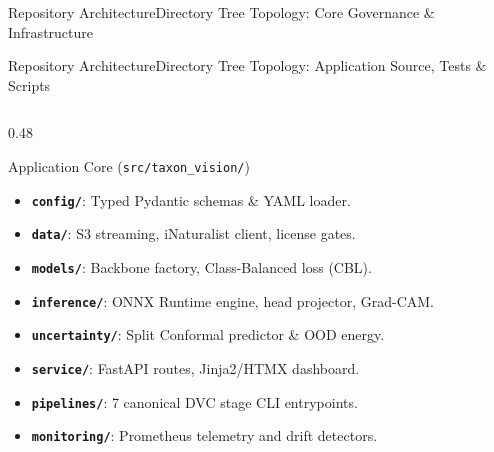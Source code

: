 \begin{frame}{Repository Architecture}{Directory Tree Topology: Core Governance \& Infrastructure}
\end{frame}

\begin{frame}{Repository Architecture}{Directory Tree Topology: Application Source, Tests \& Scripts}
    \vspace{-0.15cm}
    \begin{columns}[T]
        \begin{column}{0.48\textwidth}
            \begin{block}{Application Core (\texttt{src/taxon\_vision/})}
                \begin{itemize}\scriptsize
                    \item \textbf{\texttt{config/}}: Typed Pydantic schemas \& YAML loader.
                    \item \textbf{\texttt{data/}}: S3 streaming, iNaturalist client, license gates.
                    \item \textbf{\texttt{models/}}: Backbone factory, Class-Balanced loss (CBL).
                    \item \textbf{\texttt{inference/}}: ONNX Runtime engine, head projector, Grad-CAM.
                    \item \textbf{\texttt{uncertainty/}}: Split Conformal predictor \& OOD energy.
                    \item \textbf{\texttt{service/}}: FastAPI routes, Jinja2/HTMX dashboard.
                    \item \textbf{\texttt{pipelines/}}: 7 canonical DVC stage CLI entrypoints.
                    \item \textbf{\texttt{monitoring/}}: Prometheus telemetry and drift detectors.
                \end{itemize}
            \end{block}
        \end{column}

\end{columns}
\end{frame}
